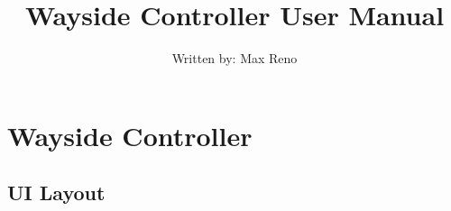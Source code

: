 



\title{Wayside Controller User Manual}
\author{Written by: Max Reno}
\date{}

\maketitle

\section{Wayside Controller}

\subsection{UI Layout}

